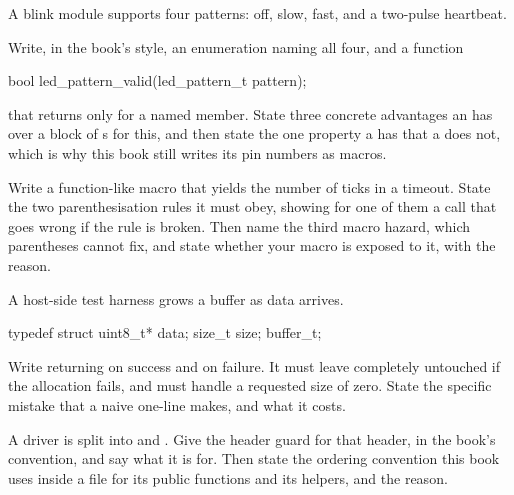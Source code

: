 \label{exb:q:1}

 A blink module supports four patterns: off, slow, fast, and a two-pulse heartbeat.

Write, in the book's style, an enumeration  naming all four, and a function

\begin{ccode}
bool led_pattern_valid(led_pattern_t pattern);
\end{ccode}

\noindent that returns  only for a named member. State three concrete advantages an
 has over a block of s for this, and then state the one property a
 has that a  does not, which is why this book still writes its pin
numbers as macros. 

 Write a function-like macro  that yields the
number of ticks in a timeout. State the two parenthesisation rules it must obey, showing for one of
them a call that goes wrong if the rule is broken. Then name the third macro hazard, which
parentheses cannot fix, and state whether your macro is exposed to it, with the reason. 

 A host-side test harness grows a buffer as data arrives.

\begin{ccode}
typedef struct
{
    uint8_t* data;
    size_t size;
} buffer_t;
\end{ccode}

\noindent Write  returning  on success and
 on failure. It must leave  completely untouched if the allocation fails, and
must handle a requested size of zero. State the specific mistake that a naive one-line
 makes, and what it costs. 

 A driver is split into  and . Give the header
guard for that header, in the book's convention, and say what it is for. Then state the ordering
convention this book uses inside a  file for its public functions and its 
helpers, and the reason. 

\label{exb:q:2}

